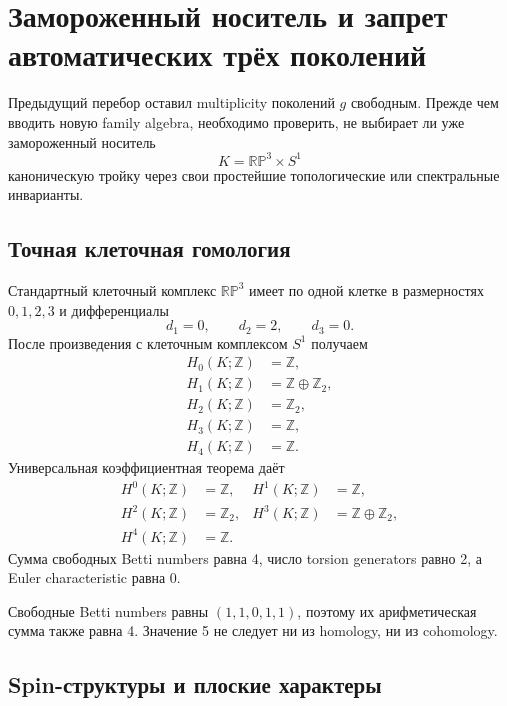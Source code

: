 \chapter{Замороженный носитель и запрет автоматических трёх поколений}

Предыдущий перебор оставил multiplicity поколений \(g\) свободным. Прежде
чем вводить новую family algebra, необходимо проверить, не выбирает ли уже
замороженный носитель
\begin{equation}
K=\mathbb{RP}^3\times S^1
\end{equation}
каноническую тройку через свои простейшие топологические или спектральные
инварианты.

\section{Точная клеточная гомология}

Стандартный клеточный комплекс \(\mathbb{RP}^3\) имеет по одной клетке в
размерностях \(0,1,2,3\) и дифференциалы
\begin{equation}
d_1=0,\qquad d_2=2,\qquad d_3=0.
\end{equation}
После произведения с клеточным комплексом \(S^1\) получаем
\begin{align}
H_0(K;\mathbb Z)&=\mathbb Z,\\
H_1(K;\mathbb Z)&=\mathbb Z\oplus\mathbb Z_2,\\
H_2(K;\mathbb Z)&=\mathbb Z_2,\\
H_3(K;\mathbb Z)&=\mathbb Z,\\
H_4(K;\mathbb Z)&=\mathbb Z.
\end{align}
Универсальная коэффициентная теорема даёт
\begin{align}
H^0(K;\mathbb Z)&=\mathbb Z,&
H^1(K;\mathbb Z)&=\mathbb Z,\\
H^2(K;\mathbb Z)&=\mathbb Z_2,&
H^3(K;\mathbb Z)&=\mathbb Z\oplus\mathbb Z_2,\\
H^4(K;\mathbb Z)&=\mathbb Z.
\end{align}
Сумма свободных Betti numbers равна 4, число torsion generators равно 2, а
Euler characteristic равна 0.

\begin{remark}
Свободные Betti numbers равны \((1,1,0,1,1)\), поэтому их арифметическая
сумма также равна 4. Значение 5 не следует ни из homology, ни из cohomology.
\end{remark}

\section{Spin-структуры и плоские характеры}

